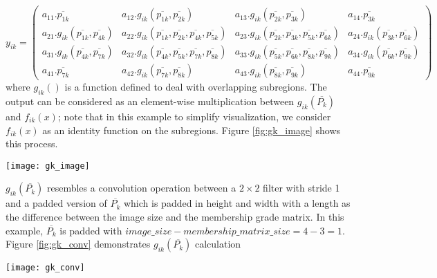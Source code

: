 \documentclass{article}
\begin{document}
\begin{equation} \label{eq:final_out}
y_{ik}=\begin{pmatrix} a_{11}.\overline{p_{1k}} & a_{12}.g_{ik}(\overline{p_{1k}},\overline{p_{2k}}) &a_{13}.g_{ik}(\overline{p_{2k}},\overline{p_{3k}}) &a_{14}.\overline{p_{3k}} \\  a_{21}.g_{ik}(\overline{p_{1k}},\overline{p_{4k}}) & a_{22}.g_{ik}(\overline{p_{1k}},\overline{p_{2k}},\overline{p_{4k}},\overline{p_{5k}}) &a_{23}.g_{ik}(\overline{p_{2k}},\overline{p_{3k}},\overline{p_{5k}},\overline{p_{6k}})&a_{24}.g_{ik}(\overline{p_{3k}},\overline{p_{6k}})\\   a_{31}.g_{ik}(\overline{p_{4k}},\overline{p_{7k}}) & a_{32}.g_{ik}(\overline{p_{4k}},\overline{p_{5k}},\overline{p_{7k}},\overline{p_{8k}}) &a_{33}.g_{ik}(\overline{p_{5k}},\overline{p_{6k}},\overline{p_{8k}},\overline{p_{9k}})&a_{34}.g_{ik}(\overline{p_{6k}},\overline{p_{9k}}) \\  a_{41}.\overline{p_{7k}} & a_{42}.g_{ik}(\overline{p_{7k}},\overline{p_{8k}})  &a_{43}.g_{ik}(\overline{p_{8k}},\overline{p_{9k}}) &a_{44}.\overline{p_{9k}} \end{pmatrix}
\end{equation}
where $g_{ik}()$ is a function defined to deal with overlapping subregions. The output can be considered as an element-wise multiplication between  $g_{ik}(\overline{P_k})$ and $f_{ik}(x)$; note that in this example to simplify visualization, we consider $f_{ik}(x)$ as an identity function on the subregions. Figure \ref{fig:gk_image} shows this process.

\begin{figure*}[ht]
\vskip 0.2in
\begin{center}
\centerline{\texttt{[image: gk\_image]}}
\caption{Element-wise multiplication between image and $g_{ik}(\overline{P_k})$}
\label{fig:gk_image}
\end{center}
\vskip -0.2in
\end{figure*}

$g_{ik}(\overline{P_k})$ resembles a convolution operation between a $2 \times 2$ filter with stride 1 and a padded version of $\overline{P_k}$ which is padded in height and width with a length as the difference between the image size and the membership grade matrix. In this example, $\overline{P_k}$ is padded with $image\_size-membership\_matrix\_size=4-3=1$. Figure \ref{fig:gk_conv} demonstrates $g_{ik}(\overline{P_k})$ calculation

\begin{figure*}[ht]
\vskip 0.2in
\begin{center}
\centerline{\texttt{[image: gk\_conv]}}
\caption{ $g_{ik}(\overline{P_k})$ calculation using convolution operation}
\label{fig:gk_conv}
\end{center}
\vskip -0.2in
\end{figure*}
\end{document}
